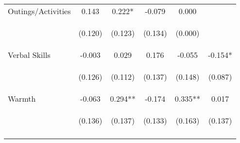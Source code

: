 \begin{tabular}{lccccc}
\noalign{\smallskip}Outings/Activities & 0.143 & 0.222* & -0.079 & 0.000 & \\
 & \begin{footnotesize}(0.120)\end{footnotesize} & \begin{footnotesize}(0.123)\end{footnotesize} & \begin{footnotesize}(0.134)\end{footnotesize} & \begin{footnotesize}(0.000)\end{footnotesize} & \begin{footnotesize}\end{footnotesize}\\
\noalign{\smallskip}Verbal Skills & -0.003 & 0.029 & 0.176 & -0.055 & -0.154*\\
 & \begin{footnotesize}(0.126)\end{footnotesize} & \begin{footnotesize}(0.112)\end{footnotesize} & \begin{footnotesize}(0.137)\end{footnotesize} & \begin{footnotesize}(0.148)\end{footnotesize} & \begin{footnotesize}(0.087)\end{footnotesize}\\
\noalign{\smallskip}Warmth & -0.063 & 0.294** & -0.174 & 0.335** & 0.017\\
 & \begin{footnotesize}(0.136)\end{footnotesize} & \begin{footnotesize}(0.137)\end{footnotesize} & \begin{footnotesize}(0.133)\end{footnotesize} & \begin{footnotesize}(0.163)\end{footnotesize} & \begin{footnotesize}(0.137)\end{footnotesize}\\
\noalign{\smallskip}\hline\end{tabular}\\
